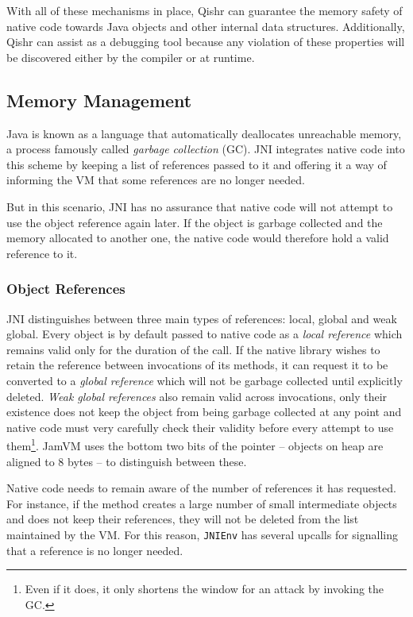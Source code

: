 \documentclass[a4paper,12pt,twoside,openright]{report}
\begin{document}
With all of these mechanisms in place, Qishr can guarantee the memory safety of native code towards Java objects and other internal data structures. Additionally, Qishr can assist as a debugging tool because any violation of these properties will be discovered either by the compiler or at runtime.

\subsection{Memory Management}

Java is known as a language that automatically deallocates unreachable memory, a process famously called \emph{garbage collection} (GC). JNI integrates native code into this scheme by keeping a list of references passed to it and offering it a way of informing the VM that some references are no longer needed. 

But in this scenario, JNI has no assurance that native code will not attempt to use the object reference again later. If the object is garbage collected and the memory allocated to another one, the native code would therefore hold a valid reference to it.

\subsubsection{Object References}
\label{sec:LocalAndGlobalRefs}

JNI distinguishes between three main types of references: local, global and weak global. Every object is by default passed to native code as a \emph{local reference} which remains valid only for the duration of the call. If the native library wishes to retain the reference between invocations of its methods, it can request it to be converted to a \emph{global reference} which will not be garbage collected until explicitly deleted. \emph{Weak global references} also remain valid across invocations, only their existence does not keep the object from being garbage collected at any point and native code must very carefully check their validity before every attempt to use them\footnote{Even if it does, it only shortens the window for an attack by invoking the GC.}. JamVM uses the bottom two bits of the pointer -- objects on heap are aligned to 8 bytes -- to distinguish between these.

Native code needs to remain aware of the number of references it has requested. For instance, if the method creates a large number of small intermediate objects and does not keep their references, they will not be deleted from the list maintained by the VM. For this reason, \texttt{JNIEnv} has several upcalls for signalling that a reference is no longer needed. 
\end{document}
